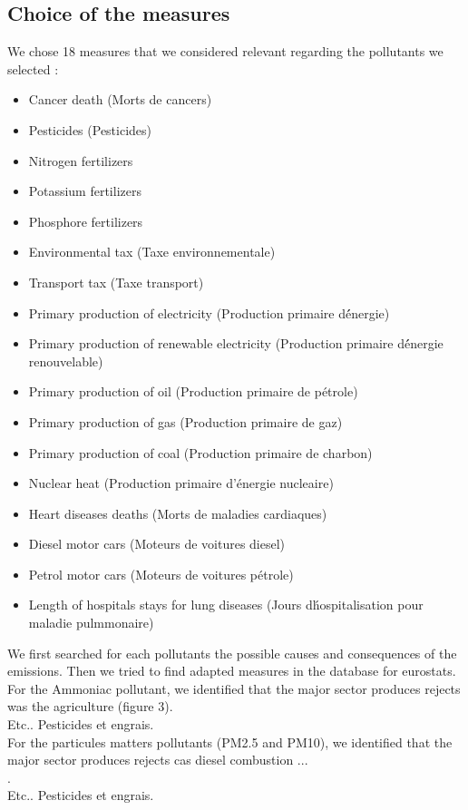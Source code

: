 \documentclass[preprint,journal]{vgtc}       %
\begin{document}
	\subsection{Choice of the measures}
	We chose 18 measures that we considered relevant regarding the pollutants we selected : 
		\begin{itemize}
		\item Cancer death (Morts de cancers)
		\item Pesticides (Pesticides)
		\item Nitrogen fertilizers
		\item Potassium fertilizers
		\item Phosphore fertilizers
		\item Environmental tax (Taxe environnementale)
		\item Transport tax (Taxe transport)
		\item Primary production of electricity (Production primaire d\'énergie)
		\item Primary production of renewable electricity (Production primaire d\'énergie renouvelable)
		\item Primary production of oil (Production primaire de pétrole)
		\item Primary production of gas (Production primaire de gaz)
		\item Primary production of coal (Production primaire de charbon)
		\item Nuclear heat (Production primaire d'énergie nucleaire)
		\item Heart diseases deaths (Morts de maladies cardiaques)
		\item Diesel motor cars (Moteurs de voitures diesel)
		\item Petrol motor cars (Moteurs de voitures pétrole)
		\item Length of hospitals stays for lung diseases (Jours d\'hospitalisation pour maladie pulmmonaire)
		\end{itemize}
		
		We first searched for each pollutants the possible causes and consequences of the emissions. Then we tried to find adapted measures in the database for eurostats.\\
		For the Ammoniac pollutant, we identified that the major sector produces rejects was the agriculture (figure 3).\\
		Etc.. Pesticides et engrais.\\
		
		For the particules matters pollutants (PM2.5 and PM10), we identified that the major sector produces rejects cas diesel combustion ...\\
		.\\
		Etc.. Pesticides et engrais.\\
		
\end{document}
